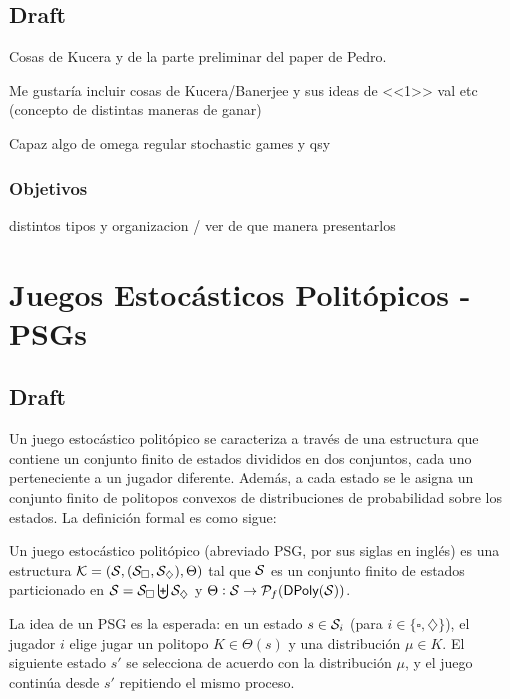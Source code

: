 \subsection{Draft}
Cosas de Kucera y de la parte preliminar del paper de Pedro.

Me gustaría incluir cosas de Kucera/Banerjee y sus ideas de <<1>> val etc
(concepto de distintas maneras de ganar)

Capaz algo de omega regular stochastic games y qsy

\subsubsection{Objetivos}

distintos tipos y organizacion / ver de que manera presentarlos

\section{Juegos Estocásticos Politópicos - PSGs}

\subsection{Draft}

Un juego estocástico politópico se caracteriza a través de una estructura que
contiene un conjunto finito de estados divididos en dos conjuntos, cada uno
perteneciente a un jugador diferente. Además, a cada estado se le asigna un
conjunto finito de politopos convexos de distribuciones de probabilidad sobre
los estados. La definición formal es como sigue:

\begin{definition}[PSG]
	Un juego estocástico politópico (abreviado PSG, por sus siglas en inglés) es una estructura \( \mathcal{K} = (\mathcal{S}, (\mathcal{S}_\square, \mathcal{S}_\diamondsuit), \Theta) \) tal que \( \mathcal{S} \) es un conjunto finito de estados particionado en \( \mathcal{S} = \mathcal{S}_\square \biguplus \mathcal{S}_\diamondsuit \) y \( \Theta : \mathcal{S} \to \mathcal{P}_f(\textsf{DPoly}(\mathcal{S})) \).
\end{definition}

La idea de un PSG es la esperada: en un estado \( s \in \mathcal{S}_i \) (para \( i \in
\{ \square, \diamondsuit \} \)), el jugador \( i \) elige jugar un politopo \(
K \in \Theta(s) \) y una distribución \( \mu \in K \). El siguiente estado \(
s' \) se selecciona de acuerdo con la distribución \( \mu \), y el juego
continúa desde \( s' \) repitiendo el mismo proceso.

